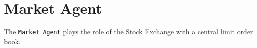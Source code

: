 \section{Market Agent}
\label{Chapters/Implementation/Market-Agent}
The \texttt{Market Agent} plays the role of the Stock Exchange with a central limit order book.